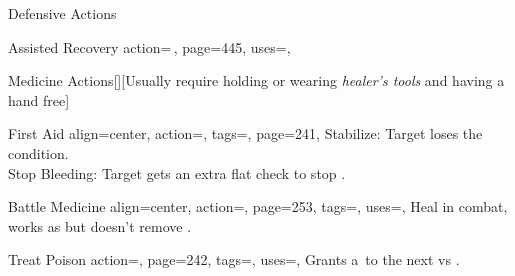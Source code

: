 \begin{PageBackLandscape}
\begin{TablesHalf}{\backTableHeight}
\begin{Table}{Defensive Actions}
\begin{entry}{Assisted Recovery}{%
                action={\,\sffamily{}},
                page=445,
                uses=,
            }
                 \hfill
            \end{entry}
        \end{Table}
        \TableSpace
        \begin{Table}{Medicine Actions}[][\quad Usually require holding or wearing \textit{healer's tools} and having
        a hand
        free]
            \begin{entry}{First Aid}{%
                align=center,
                action=,
                tags=\Manipulate,
                page=241,
            }%
                \setlength{\tabcolsep}{9pt}%
                \Medicine[][before=Recovery,val=+5]\edash Stabilize:
                Target loses the \Dying condition. \hfill
                \\
                \Medicine[][before=Effect] \hspace{0.2ex}\edash\hspace{0.2ex}Stop Bleeding:
                Target gets an extra \DC[10] flat check to stop \Bleeding.\hfill
            \end{entry}
            \begin{entry}{Battle Medicine}{%
                align=center,
                action=,
                page=253,
                tags=\Manipulate,
                uses=\Medicine\Feat,
            }
                Heal in combat, works as  but doesn't remove \Wounded.\hfill
                \\\hfill
                \T\DC[15] \quad\quad
                \E\DC[20] \quad\quad
                \M\DC[30]  \quad\quad
                \Le\DC[40] \hfill {}
            \end{entry}
            \begin{entry}{Treat Poison}{%
                action=,
                page=242,
                tags=\Manipulate,
                uses={\Medicine[tags={T}]},
            }
                Grants a \,\Cirm to the next  vs .\hfill
            \end{entry}
        \end{Table}

\end{TablesHalf}
\end{PageBackLandscape}
